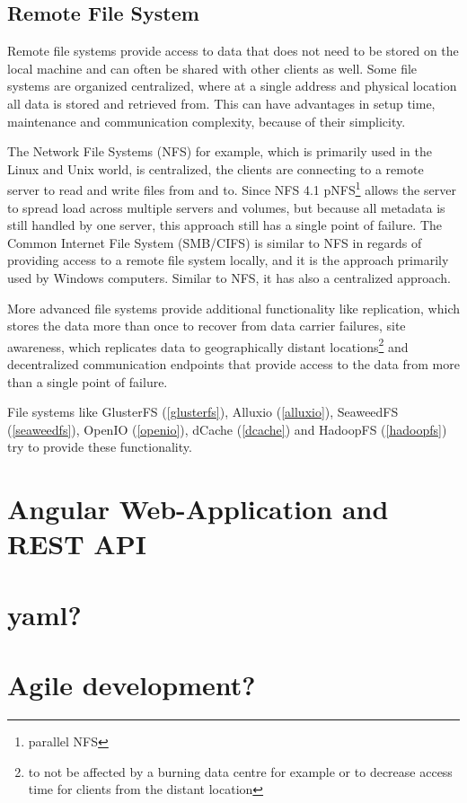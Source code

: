 \subsection{Remote File System}
\label{analysis:storage:organisation}

Remote file systems provide access to data that does not need to be stored on the local machine and can often be shared with other clients as well.
Some file systems are organized centralized, where at a single address and physical location all data is stored and retrieved from.
This can have advantages in setup time, maintenance and communication complexity, because of their simplicity.

The Network File Systems (NFS) for example, which is primarily used in the Linux and Unix world, is centralized, the clients are connecting to a remote server to read and write files from and to.
Since NFS 4.1 pNFS\footnote{parallel NFS}\cite[p. 14, section 1.7.2.2]{nfs:pnfs} allows the server to spread load across multiple servers and volumes, but because all metadata is still handled by one server, this approach still has a single point of failure.
The Common Internet File System (SMB/CIFS) is similar to NFS in regards of providing access to a remote file system locally, and it is the approach primarily used by Windows computers.
Similar to NFS, it has also a centralized approach.


More advanced file systems provide additional functionality like replication, which stores the data more than once to recover from data carrier failures, site awareness, which replicates data to geographically distant locations\footnote{to not be affected by a burning data centre for example or to decrease access time for clients from the distant location} and decentralized communication endpoints that provide access to the data from more than a single point of failure.


File systems like GlusterFS (\autoref{glusterfs}), Alluxio (\autoref{alluxio}), SeaweedFS (\autoref{seaweedfs}), OpenIO (\autoref{openio}), dCache (\autoref{dcache}) and HadoopFS (\autoref{hadoopfs}) try to provide these functionality.


\section{Angular Web-Application and REST API}
\label{fundamental:angular}






\section{yaml?}


\section{Agile development?}
\label{fundamental:agile}

